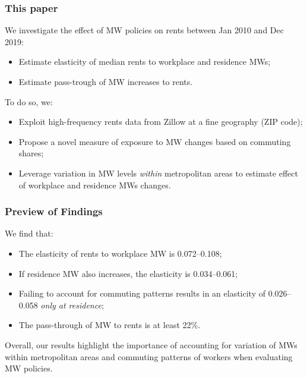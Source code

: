 \begin{frame}
	\frametitle{This paper}
	We investigate the effect of MW policies on rents between Jan 2010 and Dec 
	2019:
	\begin{itemize}
		\vspace{.5mm} \item Estimate elasticity of median rents to workplace and 
		residence MWs;
		
		\vspace{.5mm} \item Estimate pass-trough of MW increases to rents.
	\end{itemize}
	
	\vspace{3mm}
	\pause
	To do so, we:
	\begin{itemize}
    	\vspace{.5mm} \item Exploit high-frequency rents data from Zillow at a fine 
    	geography (ZIP code);
    	
    	\vspace{.5mm} \item Propose a novel measure of exposure to MW changes based on 
    	commuting shares;
    	
    	\vspace{.5mm} \item Leverage variation in MW levels \textit{within} metropolitan 
    	areas to estimate effect of workplace and residence MWs changes.
	\end{itemize}
\end{frame}

\begin{frame}
	\frametitle{Preview of Findings}
	
	We find that:
	\begin{itemize}
		\vspace{.5mm} \item
		The elasticity of rents to workplace MW is 0.072--0.108;
		
		\vspace{.5mm} \item
		If residence MW also increases, the elasticity is 0.034--0.061;
		
		\vspace{.5mm} \item
		Failing to account for commuting patterns results in an elasticity of 
		0.026--0.058 \textit{only at residence};
		
		\vspace{.5mm} \item
		The pass-through of MW to rents is at least 22\%.
	\end{itemize}
	
	\pause
	\vspace{4mm}
	Overall, our results highlight the importance of accounting for variation of MWs 
	within metropolitan areas and commuting patterns of workers when evaluating MW 
	policies.
\end{frame}


%	
%	
